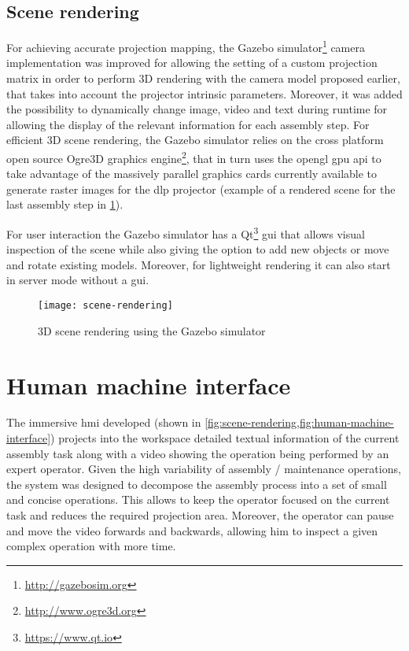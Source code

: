 \subsection{Scene rendering}

For achieving accurate projection mapping, the Gazebo simulator\footnote{\url{http://gazebosim.org}} camera implementation was improved for allowing the setting of a custom projection matrix in order to perform 3D rendering with the camera model proposed earlier, that takes into account the projector intrinsic parameters. Moreover, it was added the possibility to dynamically change image, video and text during runtime for allowing the display of the relevant information for each assembly step.
For efficient 3D scene rendering, the Gazebo simulator relies on the cross platform open source Ogre3D graphics engine\footnote{\url{http://www.ogre3d.org}}, that in turn uses the \gls{opengl} \gls{gpu} \gls{api} to take advantage of the massively parallel graphics cards currently available to generate raster images for the \gls{dlp} projector (example of a rendered scene for the last assembly step in \cref{fig:scene-rendering}).

For user interaction the Gazebo simulator has a Qt\footnote{\url{https://www.qt.io}} \gls{gui} that allows visual inspection of the scene while also giving the option to add new objects or move and rotate existing models. Moreover, for lightweight rendering it can also start in server mode without a \gls{gui}.

\vspace{-0.5em}
\begin{figure}[ht]
	\centering
	\texttt{[image: scene-rendering]}
	\caption{3D scene rendering using the Gazebo simulator}
	\label{fig:scene-rendering}
	\vspace{-0.5em}
\end{figure}
\vspace{-0.5em}


\section{Human machine interface}\label{sec:human-machine-interaction}

The immersive \gls{hmi} developed (shown in \cref{fig:scene-rendering,fig:human-machine-interface}) projects into the workspace detailed textual information of the current assembly task along with a video showing the operation being performed by an expert operator. Given the high variability of assembly / maintenance operations, the system was designed to decompose the assembly process into a set of small and concise operations. This allows to keep the operator focused on the current task and reduces the required projection area. Moreover, the operator can pause and move the video forwards and backwards, allowing him to inspect a given complex operation with more time.

